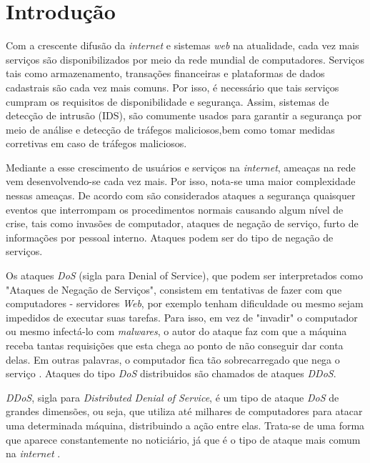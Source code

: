 \chapter[Introdução]{Introdução}
\label{introducao}
Com a crescente difusão da \textit{internet} e sistemas \textit{web} na
atualidade, cada  vez mais serviços são disponibilizados por meio da rede mundial de computadores. Serviços tais como armazenamento, transações financeiras e plataformas de dados cadastrais são cada vez mais comuns. Por isso, é necessário que tais serviços cumpram os requisitos de disponibilidade e segurança. Assim, sistemas de detecção de intrusão (IDS), são comumente usados para garantir a segurança por meio de análise e detecção de tráfegos maliciosos,bem como tomar medidas corretivas em caso de tráfegos maliciosos.

Mediante a esse crescimento de usuários e serviços na \textit{internet}, ameaças na rede vem desenvolvendo-se cada vez mais. Por isso, nota-se uma maior complexidade nessas ameaças. De acordo com  são considerados ataques a segurança quaisquer eventos que interrompam os procedimentos normais causando algum nível de crise, tais como invasões de computador, ataques de negação de serviço, furto de informações por pessoal interno. Ataques podem ser do tipo de negação de serviços.

Os ataques \textit{DoS} (sigla para Denial of Service), que podem ser interpretados como "Ataques de Negação de Serviços", consistem em tentativas de fazer com que computadores - servidores \textit{Web}, por exemplo tenham dificuldade ou mesmo sejam impedidos de executar suas tarefas. Para isso, em vez de "invadir" o computador ou mesmo infectá-lo com \textit{malwares}, o autor do ataque faz com que a máquina receba tantas requisições que esta chega ao ponto de não conseguir dar conta delas. Em outras palavras, o computador fica tão sobrecarregado que nega o serviço \cite{HOQUE201748}. Ataques do tipo \textit{DoS} distribuidos são chamados de ataques \textit{DDoS}.

 \textit{DDoS}, sigla para \textit{Distributed Denial of Service}, é um tipo de ataque  \textit{DoS} de grandes dimensões, ou seja, que utiliza até milhares de computadores para atacar uma determinada máquina, distribuindo a ação entre elas. Trata-se de uma forma que aparece constantemente no noticiário, já que é o tipo de ataque mais comum na \textit{internet} \cite{alecrim2008ataques}.
	
